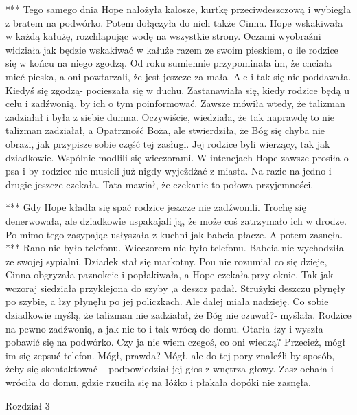 \documentclass[12pt,a4paper]{book}
\begin{document}
                                                   ***
Tego samego dnia Hope nałożyła kalosze, kurtkę przeciwdeszczową i wybiegła z bratem na podwórko. Potem dołączyła do nich także Cinna. Hope wskakiwała w każdą kałużę, rozchlapując wodę na wszystkie strony. Oczami wyobraźni widziała jak będzie wskakiwać w kałuże razem ze swoim pieskiem, o ile rodzice się w końcu na niego zgodzą. Od roku sumiennie przypominała im, że chciała mieć pieska, a oni powtarzali, że jest jeszcze za mała. Ale i tak się nie poddawała. Kiedyś się zgodzą- pocieszała się w duchu. 
Zastanawiała się, kiedy rodzice będą u celu i zadźwonią, by ich o tym poinformować. Zawsze mówiła wtedy, że talizman zadziałał i była z siebie dumna. Oczywiście, wiedziała, że tak naprawdę to nie talizman zadziałał, a Opatrzność Boża, ale stwierdziła, że Bóg się chyba nie obrazi, jak przypisze sobie część tej zasługi. Jej rodzice byli wierzący, tak jak dziadkowie. Wspólnie modlili się wieczorami. W intencjach Hope zawsze prosiła o psa i by rodzice nie musieli już nigdy wyjeżdżać z miasta. Na razie na jedno i drugie jeszcze czekała. Tata mawiał, że czekanie to połowa przyjemności. 
                               
                                       ***
 Gdy Hope kładła się spać rodzice jeszcze nie zadźwonili. Trochę się denerwowała, ale dziadkowie uspakajali ją, że może coś zatrzymało ich w drodze. Po mimo tego zasypając usłyszała z kuchni jak babcia płacze. A potem zasnęła. 
                                     ***
Rano nie było telefonu. Wieczorem nie było telefonu. Babcia nie wychodziła ze swojej sypialni. Dziadek stał się markotny. Pou nie rozumiał co się dzieje, Cinna obgryzała paznokcie i popłakiwała, a Hope czekała przy oknie. Tak jak wczoraj siedziała przyklejona do szyby  ,a deszcz padał. Strużyki deszczu płynęły po szybie, a łzy płynęłu po jej policzkach. Ale dalej miała nadzieję. Co sobie dziadkowie myślą, że talizman nie zadziałał, że Bóg nie czuwał?- myślała. Rodzice na pewno zadźwonią, a jak nie to i tak wrócą do domu. Otarła łzy i wyszła pobawić się na podwórko. Czy ja nie wiem czegoś, co oni wiedzą? Przecież, mógł im się zepsuć telefon. Mógł, prawda? Mógł, ale do tej pory znaleźli by sposób, żeby się skontaktować – podpowiedział jej głos z wnętrza głowy. Zaszlochała i wróciła do domu, gdzie rzuciła się na łóżko i płakała dopóki nie zasnęła. 

Rozdział 3
\end{document}
